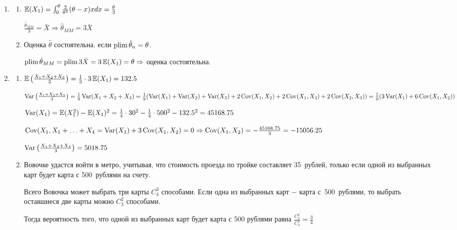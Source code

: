 \begin{enumerate}[resume]
\begin{enumerate}
\begin{enumerate}
$\Var(\hat \theta_{ML}) \approx 4 \mu^2 \Var(\hat \mu) = \frac{4 \mu^2}{n}$
\item Так как $\hat \theta_{ML}$ асимптотически несмещена, то для проверки
состоятельности достаточно показать, что
$\Var(\hat \theta_{ML}) = \frac{4\mu^2}{n} \to_{n \to \infty} 0$.
\end{enumerate}
\item[6.]
\begin{enumerate}
\item $\operatorname{\mathbb{E}}(X_1) = \int_{0}^{\theta} \frac{2}{\theta^2}(\theta - x)x dx = \frac{\theta}{3}$

$\frac{\hat \theta_{MM}}{3} = \bar X \Rightarrow \hat \theta_{MM} = 3 \bar X$
\item Оценка $\hat \theta$ состоятельна. если $\operatorname*{plim} \hat \theta_n = \theta$.

$\operatorname*{plim} \hat \theta_{MM} = \operatorname*{plim} 3 \bar X = 3 \operatorname{\mathbb{E}}(X_1) = \theta \Rightarrow$ оценка состоятельна.
\end{enumerate}
\item[7.]
\begin{enumerate}
\item $\operatorname{\mathbb{E}}\left(\frac{X_1 + X_2 + X_3}{3} \right) = \frac{1}{3} \cdot 3 \operatorname{\mathbb{E}}(X_1) = 132.5$

$\operatorname{Var}\left(\frac{X_1 + X_2 + X_3}{3} \right) = \frac{1}{9} \operatorname{Var}(X_1 + X_2 + X_3) =
\frac{1}{9} (\operatorname{Var}(X_1) + \operatorname{Var}(X_2) + \operatorname{Var}(X_3) + 2 \operatorname{Cov}(X_1, X_2) + 2\operatorname{Cov}(X_1, X_3) + 2\operatorname{Cov}(X_2, X_3)) =
\frac{1}{9}(3\operatorname{Var}(X_1) + 6\operatorname{Cov}(X_1,X_2))$

$\operatorname{Var}(X_1) = \operatorname{\mathbb{E}}(X_1^2) - \operatorname{\mathbb{E}}(X_1)^2 = \frac{1}{4} \cdot 30^2 - \frac{1}{4} \cdot 500^2 - 132.5^2 = 45168.75$

$\operatorname{Cov}(X_1, X_1 + \ldots + X_4 = \operatorname{Var}(X_1) + 3\operatorname{Cov}(X_1,X_2) = 0 \Rightarrow \operatorname{Cov}(X_1,X_2) = -\frac{45168.75}{3} = -15056.25$

$\operatorname{Var}\left(\frac{X_1 + X_2 + X_3}{3} \right) = 5018.75$

\item Вовочке удастся войти в метро, учитывая, что стоимость проезда по тройке составляет 35~рублей, только если одной из выбранных карт будет карта с 500~рублями на счету.

Всего Вовочка может выбрать три карты $C_4^3$ способами. Если одна из выбранных карт $-$ карта с~500~рублями, то выбрать оставшиеся две карты можно $C_3^2$ способами.

Тогда вероятность того, что одной из выбранных карт будет карта с 500 рублями равна $\displaystyle\frac{C_3^2}{C_4^3} = \frac{3}{4}$


\end{enumerate}
\end{enumerate}
\end{enumerate}
